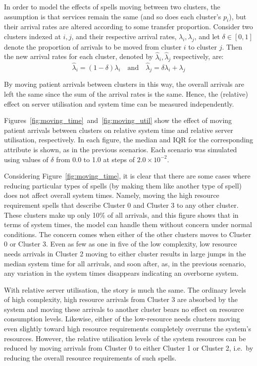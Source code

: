 In order to model the effects of spells moving between two clusters, the
assumption is that services remain the same (and so does each cluster's
\(p_i\)), but their arrival rates are altered according to some transfer
proportion. Consider two clusters indexed at \(i, j\), and their respective
arrival rates, \(\lambda_i, \lambda_j\), and let \(\delta \in [0, 1]\) denote
the proportion of arrivals to be moved from cluster \(i\) to cluster \(j\). Then
the new arrival rates for each cluster, denoted by \(\hat\lambda_i,
\hat\lambda_j\) respectively, are:
\begin{equation}\label{eq:moving}
    \hat\lambda_i = \left(1 - \delta\right) \lambda_i
    \quad \text{and} \quad
    \hat\lambda_j = \delta\lambda_i + \lambda_j
\end{equation}

By moving patient arrivals between clusters in this way, the overall arrivals
are left the same since the sum of the arrival rates is the same. Hence, the
(relative) effect on server utilisation and system time can be measured
independently.

Figures~\ref{fig:moving_time}~and~\ref{fig:moving_util} show the effect of
moving patient arrivals between clusters on relative system time and relative
server utilisation, respectively. In each figure, the median and IQR for the
corresponding attribute is shown, as in the previous scenarios. Each scenario
was simulated using values of \(\delta\) from 0.0 to 1.0 at steps of \(2.0
\times 10^{-2}\).

Considering Figure~\ref{fig:moving_time}, it is clear that there are some cases
where reducing particular types of spells (by making them like another type of
spell) does not affect overall system times. Namely, moving the high resource
requirement spells that describe Cluster 0 and Cluster 3 to any other cluster.
These clusters make up only 10\% of all arrivals, and this figure shows that in
terms of system times, the model can handle them without concern under normal
conditions. The concern comes when either of the other clusters moves to Cluster
0 or Cluster 3. Even as few as one in five of the low complexity, low resource
needs arrivals in Cluster 2 moving to either cluster results in large jumps in
the median system time for all arrivals, and soon after, as, in the previous
scenario, any variation in the system times disappears indicating an overborne
system.

With relative server utilisation, the story is much the same. The ordinary
levels of high complexity, high resource arrivals from Cluster 3 are absorbed by
the system and moving these arrivals to another cluster bears no effect on
resource consumption levels. Likewise, either of the low-resource needs clusters
moving even slightly toward high resource requirements completely overruns the
system’s resources. However, the relative utilisation levels of the system
resources can be reduced by moving arrivals from Cluster 0 to either Cluster 1
or Cluster 2, i.e.\ by reducing the overall resource requirements of such spells.

